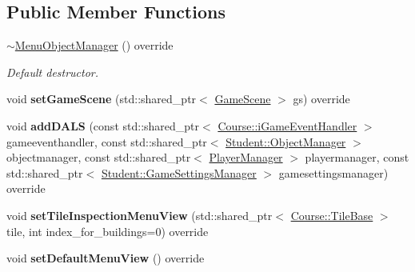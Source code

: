 \subsection*{Public Member Functions}
\begin{DoxyCompactItemize}
\item 
\hypertarget{class_student_1_1_menu_object_manager_a8af232aab21026bed8cafe819160e7b8}{\hyperlink{class_student_1_1_menu_object_manager_a8af232aab21026bed8cafe819160e7b8}{$\sim$\-Menu\-Object\-Manager} () override}\label{class_student_1_1_menu_object_manager_a8af232aab21026bed8cafe819160e7b8}

\begin{DoxyCompactList}\small\item\em Default destructor. \end{DoxyCompactList}\item 
\hypertarget{class_student_1_1_menu_object_manager_a26607811cdc8efc940aa11c5fc9a0ef7}{void {\bfseries set\-Game\-Scene} (std\-::shared\-\_\-ptr$<$ \hyperlink{class_student_1_1_game_scene}{Game\-Scene} $>$ gs) override}\label{class_student_1_1_menu_object_manager_a26607811cdc8efc940aa11c5fc9a0ef7}

\item 
\hypertarget{class_student_1_1_menu_object_manager_a9798e1932a6cefe7fad8cd1543446604}{void {\bfseries add\-D\-A\-L\-S} (const std\-::shared\-\_\-ptr$<$ \hyperlink{class_course_1_1i_game_event_handler}{Course\-::i\-Game\-Event\-Handler} $>$ gameeventhandler, const std\-::shared\-\_\-ptr$<$ \hyperlink{class_student_1_1_object_manager}{Student\-::\-Object\-Manager} $>$ objectmanager, const std\-::shared\-\_\-ptr$<$ \hyperlink{class_student_1_1_player_manager}{Player\-Manager} $>$ playermanager, const std\-::shared\-\_\-ptr$<$ \hyperlink{class_student_1_1_game_settings_manager}{Student\-::\-Game\-Settings\-Manager} $>$ gamesettingsmanager) override}\label{class_student_1_1_menu_object_manager_a9798e1932a6cefe7fad8cd1543446604}

\item 
\hypertarget{class_student_1_1_menu_object_manager_abd78726a30ad87cb5e20b9534c04a72c}{void {\bfseries set\-Tile\-Inspection\-Menu\-View} (std\-::shared\-\_\-ptr$<$ \hyperlink{class_course_1_1_tile_base}{Course\-::\-Tile\-Base} $>$ tile, int index\-\_\-for\-\_\-buildings=0) override}\label{class_student_1_1_menu_object_manager_abd78726a30ad87cb5e20b9534c04a72c}

\item 
\hypertarget{class_student_1_1_menu_object_manager_a981da78d00f5a27127fd1e219b7da77b}{void {\bfseries set\-Default\-Menu\-View} () override}\label{class_student_1_1_menu_object_manager_a981da78d00f5a27127fd1e219b7da77b}


\end{DoxyCompactItemize}
